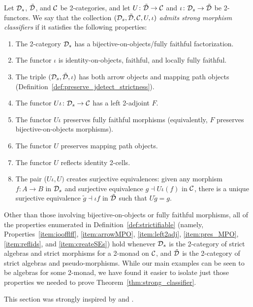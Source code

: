 \documentclass[11pt,oneside,article]{memoir}
\begin{document}
\begin{definition}
    \label{def:strictifiable}
  Let $\mathcal{D}_s$, $\tilde{\mathcal{D}}$, and $\mathcal{C}$ be 2-categories, and let $U\colon\tilde{\mathcal{D}}\to\mathcal{C}$
  and $\iota\colon\mathcal{D}_s\to\tilde{\mathcal{D}}$ be 2-functors. We say that the collection
  $(\mathcal{D}_s,\tilde{\mathcal{D}},\mathcal{C},U,\iota)$ \emph{admits strong morphism classifiers} if it satisfies
  the following properties:
  \begin{enumerate}
    \item\label{item:boff}
      The 2-category $\mathcal{D}_s$ has a bijective-on-objects/fully faithful factorization.
    \item\label{item:ioofflff}
      The functor $\iota$ is identity-on-objects, faithful, and locally fully faithful.
    \item\label{item:arrowMPO}
      The triple $(\mathcal{D}_s,\tilde{\mathcal{D}},\iota)$ has both arrow objects and mapping path objects
      (Definition~\ref{def:preserve_jdetect_strictness}).
    \item\label{item:left2adj}
      The functor $U\iota\colon\mathcal{D}_s\to\mathcal{C}$ has a left 2-adjoint $F$.
    \item\label{item:pres_ff}
      The functor $U\iota$ preserves fully faithful morphisms (equivalently, $F$ preserves
      bijective-on-objects morphisms).
    \item\label{item:pres_MPO}
      The functor $U$ preserves mapping path objects.
    \item\label{item:reflids}
      The functor $U$ reflects identity 2-cells.
    \item\label{item:createSEs}
      The pair ($U\iota,U)$ creates surjective equivalences: given any morphism $f\colon A\to B$ in
      $\mathcal{D}_s$ and surjective equivalence $g\dashv U\iota(f)$ in $\mathcal{C}$, there is a unique
      surjective equivalence $\tilde{g}\dashv\iota f$ in $\tilde{\mathcal{D}}$ such that $U\tilde{g}=g$.
  \end{enumerate}
\end{definition}

\begin{remark}
  Other than those involving bijective-on-objects or fully faithful morphisms, all of the properties
  enumerated in Definition~\ref{def:strictifiable} (namely, Properties~\ref{item:ioofflff},
  \ref{item:arrowMPO}, \ref{item:left2adj}, \ref{item:pres_MPO}, \ref{item:reflids}, and
  \ref{item:createSEs}) hold whenever $\mathcal{D}_s$ is the 2-category of strict algebras and strict
  morphisms for a 2-monad on $\mathcal{C}$, and $\tilde{\mathcal{D}}$ is the 2-category of strict algebras and
  pseudo-morphisms. While our main examples can be seen to be algebras for some 2-monad, we have
  found it easier to isolate just those properties we needed to prove
  Theorem~\ref{thm:strong_classifier}.

  This section was strongly inspired by \cite{Bourke} and \cite{LackHomotopy}.
\end{remark}
\end{document}
